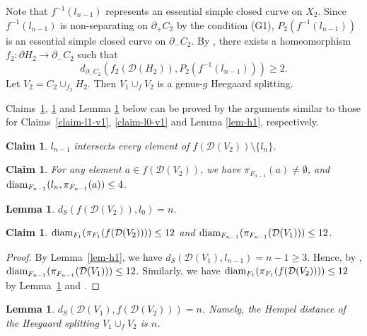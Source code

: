\documentclass[]{aspm}
\newtheorem{lemma}[definition]{Lemma}
\newtheorem{claim}[definition]{Claim}
\begin{document}
Note that $f^{-1}(l_{n-1})$ represents an essential simple closed curve on $X_2$.
Since $f^{-1}(l_{n-1})$ is non-separating on $\partial_+ C_2$ by the condition (G1), $P_2(f^{-1}(l_{n-1}))$ is an essential simple closed curve on $\partial_- C_2$.
By \cite{AS}, there exists a homeomorphism $f_2:\partial H_2 \rightarrow \partial_- C_2$ such that 
\begin{equation}\label{eqn-f2}
d_{\partial_- C_2} (f_2(\mathcal{D}(H_2)), P_2(f^{-1}(l_{n-1})))\geq 2.
\end{equation}
Let $V_2=C_2\cup_{f_2} H_2$. 
Then $V_1\cup_f V_2$ is a genus-$g$ Heegaard splitting.

Claims~\ref{claim-ln-1-v2}, \ref{claim-ln-v2} and Lemma \ref{lem-h2} below can be proved by the arguments similar to those for Claims~\ref{claim-l1-v1}, \ref{claim-l0-v1} and Lemma \ref{lem-h1}, respectively.

\begin{claim}\label{claim-ln-1-v2}
$l_{n-1}$ intersects every element of $f(\mathcal{D}(V_2))\setminus \{l_n\}$.
\end{claim}

\begin{claim}\label{claim-ln-v2}
For any element $a\in f(\mathcal{D}(V_2))$, we have $\pi_{F_{n-1}}(a)\neq \emptyset$, and ${\rm diam}_{F_{n-1}}(l_n, \pi_{F_{n-1}}(a))\leq 4$.
\end{claim}

\begin{lemma}\label{lem-h2}
$d_{S} (f(\mathcal{D}(V_2)), l_0)=n$.
\end{lemma}



\begin{claim}\label{claim-l1-v2}
${\rm diam}_{F_1}(\pi_{F_1}(f(\mathcal{D}(V_2))))\leq 12$ and ${\rm diam}_{F_{n-1}}(\pi_{F_{n-1}}(\mathcal{D}(V_1)))\leq 12$.
\end{claim}

\begin{proof}
By Lemma~\ref{lem-h1}, we have $d_S(\mathcal{D}(V_1),l_{n-1})=n-1\geq 3$.
Hence, by \cite[Theorem 1]{Li}, ${\rm diam}_{F_{n-1}}(\pi_{F_{n-1}}(\mathcal{D}(V_1)))\leq 12$. 
Similarly, we have ${\rm diam}_{F_1}(\pi_{F_1}(f(\mathcal{D}(V_2))))\leq 12$ by Lemma~\ref{lem-h2} and \cite{Li}.
\end{proof}



\begin{lemma}\label{lem-distance}
$d_{S} (\mathcal{D}(V_1), f(\mathcal{D}(V_2)))=n$. Namely, the Hempel distance of the Heegaard splitting $V_1\cup_f V_2$ is $n$.
\end{lemma}
\end{document}
